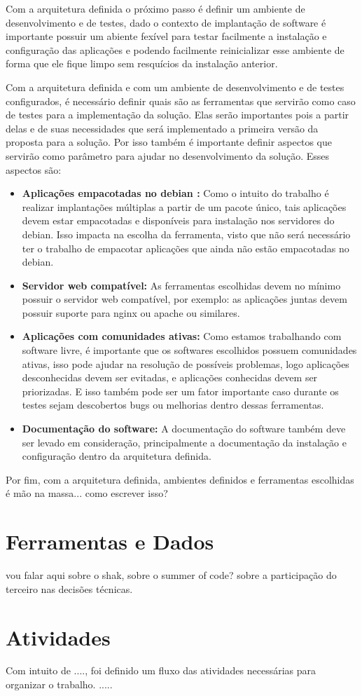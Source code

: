 Com a arquitetura definida o próximo passo é definir um ambiente de desenvolvimento e de
testes, dado o contexto de implantação de software é importante possuir um abiente fexível para
testar facilmente a instalação e configuração das aplicações e podendo facilmente
reinicializar esse ambiente de forma que ele fique limpo sem resquícios da instalação
anterior.

Com a arquitetura definida e com um ambiente de desenvolvimento e de testes configurados, é
necessário definir quais são as ferramentas que servirão como caso de testes
para a implementação da solução. Elas serão importantes pois a partir delas
e de suas necessidades que será implementado a primeira versão da proposta para
a solução. Por isso também é importante definir aspectos que servirão como parâmetro
para ajudar no desenvolvimento da solução. Esses aspectos são:

\begin{itemize}
  \item  \textbf{Aplicações empacotadas no debian :}  Como o intuito do trabalho
  é realizar implantações múltiplas a partir de um pacote único, tais aplicações
  devem estar empacotadas e disponíveis para instalação nos servidores do debian.
  Isso impacta na escolha da ferramenta, visto que não será necessário ter o trabalho
  de empacotar aplicações que ainda não estão empacotadas no debian.
  \item  \textbf{Servidor web compatível:} As ferramentas escolhidas devem no
  mínimo possuir o servidor web compatível, por exemplo: as aplicações juntas
  devem possuir suporte para nginx ou apache ou similares.
  \item  \textbf{Aplicações com comunidades ativas:} Como estamos trabalhando
  com software livre, é importante que os softwares escolhidos possuem comunidades
  ativas, isso pode ajudar na resolução de  possíveis problemas, logo aplicações
  desconhecidas devem ser evitadas, e aplicações conhecidas devem ser priorizadas.
  E isso também pode ser um fator importante caso durante os testes sejam descobertos
  bugs ou melhorias dentro dessas ferramentas.
  \item  \textbf{Documentação do software:} A documentação do software também deve
  ser levado em consideração, principalmente a documentação da instalação e configuração
  dentro da arquitetura definida.
\end{itemize}

Por fim, com a arquitetura definida, ambientes definidos e ferramentas escolhidas
é mão na massa... como escrever isso?

\section{Ferramentas e Dados}

vou falar aqui sobre o shak, sobre o summer of code? sobre a participação do terceiro
nas decisões técnicas.

\section{Atividades}

Com intuito de ...., foi definido um fluxo das atividades necessárias para organizar
o trabalho. .....

%
